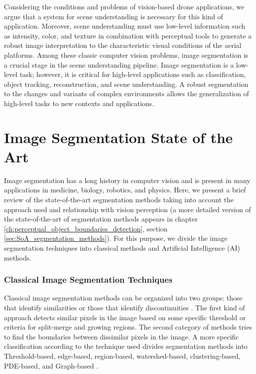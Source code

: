 Considering the conditions and problems of vision-based drone applications, we argue that a system for scene understanding is necessary for this kind of application. Moreover, scene understanding must use low-level information such as intensity, color, and texture in combination with perceptual tools to generate a robust image interpretation to the characteristic visual conditions of the aerial platforms. Among these classic computer vision problems, image segmentation is a crucial stage in the scene understanding pipeline. Image segmentation is a low-level task; however, it is critical for high-level applications such as classification, object tracking, reconstruction, and scene understanding. A robust segmentation to the changes and variants of complex environments allows the generalization of high-level tasks to new contexts and applications.

\section*{Image Segmentation State of the Art}

Image segmentation has a long history in computer vision and is present in many applications in medicine, biology, robotics, and physics. Here, we present a brief review of the state-of-the-art segmentation methods taking into account the approach used and relationship with vision perception (a more detailed version of the state-of-the-art of segmentation methods appears in chapter \ref{ch:perceptual_object_boundaries_detection}, section \ref{sec:SoA_segmentation_methods}). For this purpose, we divide the image segmentation techniques into classical methods and Artificial Intelligence (AI) methods. 

\subsubsection*{Classical Image Segmentation Techniques} 
Classical image segmentation methods can be organized into two groups: those that identify similarities or those that identify discontinuities \citep{Zaitoun.Aqel:ICCMIT:2015}. The first kind of approach detects similar pixels in the image based on some specific threshold or criteria for split-merge and growing regions. The second category of methods tries to find the boundaries between dissimilar pixels in the image. A more specific classification according to the technique used divides segmentation methods into Threshold-based, edge-based, region-based, watershed-based, clustering-based, PDE-based, and Graph-based \citep{Zaitoun.Aqel:ICCMIT:2015}.

